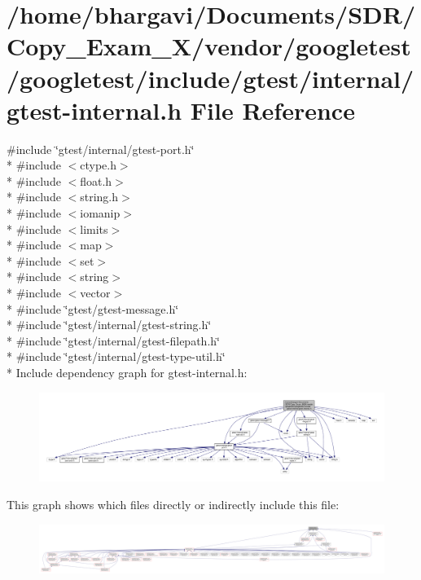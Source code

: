 \hypertarget{gtest-internal_8h}{}\section{/home/bhargavi/\+Documents/\+S\+D\+R/\+Copy\+\_\+\+Exam\+\_\+X/vendor/googletest/googletest/include/gtest/internal/gtest-\/internal.h File Reference}
\label{gtest-internal_8h}
{\ttfamily \#include \char`\"{}gtest/internal/gtest-\/port.\+h\char`\"{}}\\*
{\ttfamily \#include $<$ctype.\+h$>$}\\*
{\ttfamily \#include $<$float.\+h$>$}\\*
{\ttfamily \#include $<$string.\+h$>$}\\*
{\ttfamily \#include $<$iomanip$>$}\\*
{\ttfamily \#include $<$limits$>$}\\*
{\ttfamily \#include $<$map$>$}\\*
{\ttfamily \#include $<$set$>$}\\*
{\ttfamily \#include $<$string$>$}\\*
{\ttfamily \#include $<$vector$>$}\\*
{\ttfamily \#include \char`\"{}gtest/gtest-\/message.\+h\char`\"{}}\\*
{\ttfamily \#include \char`\"{}gtest/internal/gtest-\/string.\+h\char`\"{}}\\*
{\ttfamily \#include \char`\"{}gtest/internal/gtest-\/filepath.\+h\char`\"{}}\\*
{\ttfamily \#include \char`\"{}gtest/internal/gtest-\/type-\/util.\+h\char`\"{}}\\*
Include dependency graph for gtest-\/internal.h\+:
\nopagebreak
\begin{figure}[H]
\begin{center}
\leavevmode
\includegraphics[width=350pt]{gtest-internal_8h__incl}
\end{center}
\end{figure}
This graph shows which files directly or indirectly include this file\+:
\nopagebreak
\begin{figure}[H]
\begin{center}
\leavevmode
\includegraphics[width=350pt]{gtest-internal_8h__dep__incl}
\end{center}
\end{figure}

